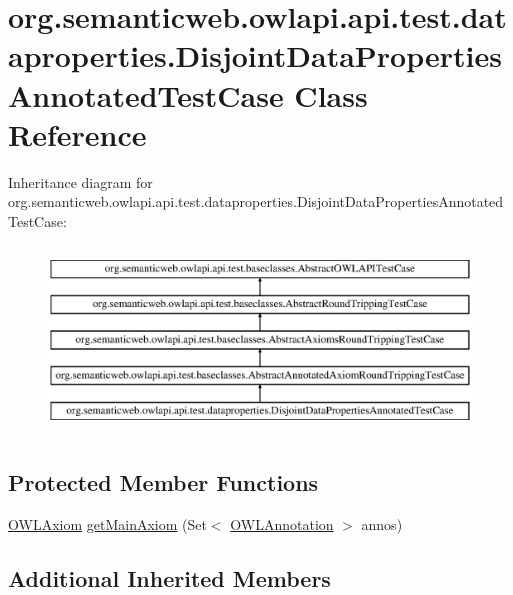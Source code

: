 \hypertarget{classorg_1_1semanticweb_1_1owlapi_1_1api_1_1test_1_1dataproperties_1_1_disjoint_data_properties_annotated_test_case}{\section{org.\-semanticweb.\-owlapi.\-api.\-test.\-dataproperties.\-Disjoint\-Data\-Properties\-Annotated\-Test\-Case Class Reference}
\label{classorg_1_1semanticweb_1_1owlapi_1_1api_1_1test_1_1dataproperties_1_1_disjoint_data_properties_annotated_test_case}
}
Inheritance diagram for org.\-semanticweb.\-owlapi.\-api.\-test.\-dataproperties.\-Disjoint\-Data\-Properties\-Annotated\-Test\-Case\-:\begin{figure}[H]
\begin{center}
\leavevmode
\includegraphics[height=5.000000cm]{classorg_1_1semanticweb_1_1owlapi_1_1api_1_1test_1_1dataproperties_1_1_disjoint_data_properties_annotated_test_case}
\end{center}
\end{figure}
\subsection*{Protected Member Functions}
\begin{DoxyCompactItemize}
\item 
\hyperlink{interfaceorg_1_1semanticweb_1_1owlapi_1_1model_1_1_o_w_l_axiom}{O\-W\-L\-Axiom} \hyperlink{classorg_1_1semanticweb_1_1owlapi_1_1api_1_1test_1_1dataproperties_1_1_disjoint_data_properties_annotated_test_case_adb945ddfd6c642c3f49b6d39f78d9957}{get\-Main\-Axiom} (Set$<$ \hyperlink{interfaceorg_1_1semanticweb_1_1owlapi_1_1model_1_1_o_w_l_annotation}{O\-W\-L\-Annotation} $>$ annos)
\end{DoxyCompactItemize}
\subsection*{Additional Inherited Members}


